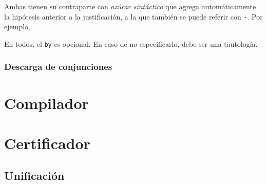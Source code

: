 Ambas tienen su contraparte con \textit{azúcar sintáctico} que agrega
automáticamente la hipótesis anterior a la justificación, a la que también se
puede referir con \texttt{-}. Por ejemplo, 




En todos, el \lstinline{by} es opcional. En caso de no especificarlo, debe ser
una tautología.





\subsubsection{Descarga de conjunciones}\label{ppa:sec:and-intro}


\section{Compilador}

\section{Certificador}

\subsection{Unificación}
\label{ppa:sec:unification}